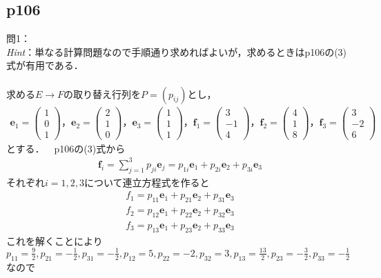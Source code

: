 \documentclass[dvipdfmx,uplatex,11pt]{jsarticle}
\begin{document}
\subsection{p106}
\noindent
問1：\\
\textsl{Hint}：単なる計算問題なので手順通り求めればよいが，求めるときはp106の(3)式が有用である．\\ \\
求める$E→F$の取り替え行列を$P=(p_{ij})$とし，
\begin{eqnarray*}
\bm{e}_1=
\begin{pmatrix}
1 \\
0 \\
1
\end{pmatrix}
，
\bm{e}_2=
\begin{pmatrix}
2 \\
1 \\
0
\end{pmatrix}
，
\bm{e}_3=
\begin{pmatrix}
1 \\
1 \\
1
\end{pmatrix}
，
\bm{f}_1=
\begin{pmatrix}
3 \\
-1 \\
4
\end{pmatrix}
，
\bm{f}_2=
\begin{pmatrix}
4 \\
1 \\
8
\end{pmatrix}
，
\bm{f}_3=
\begin{pmatrix}
3 \\
-2 \\
6
\end{pmatrix}
\end{eqnarray*}
とする．~~p106の(3)式から
\begin{eqnarray*}
\bm{f}_i=\sum^{3}_{j=1}p_{ji}\bm{e}_{j}=p_{1i}\bm{e}_1+p_{2i}\bm{e}_2+p_{3i}\bm{e}_3
\end{eqnarray*}
それぞれ$i=1,2,3$について連立方程式を作ると
\begin{eqnarray*}
f_1=p_{11}\bm{e}_1+p_{21}\bm{e}_2+p_{31}\bm{e}_3 \\
f_2=p_{12}\bm{e}_1+p_{22}\bm{e}_2+p_{32}\bm{e}_3 \\
f_3=p_{13}\bm{e}_1+p_{23}\bm{e}_2+p_{33}\bm{e}_3
\end{eqnarray*}
これを解くことにより$p_{11}=\frac{9}{2},p_{21}=-\frac{1}{2},p_{31}=-\frac{1}{2},p_{12}=5,p_{22}=-2,p_{32}=3,p_{13}=\frac{13}{2},p_{23}=-\frac{3}{2},p_{33}=-\frac{1}{2}$なので
\end{document}
